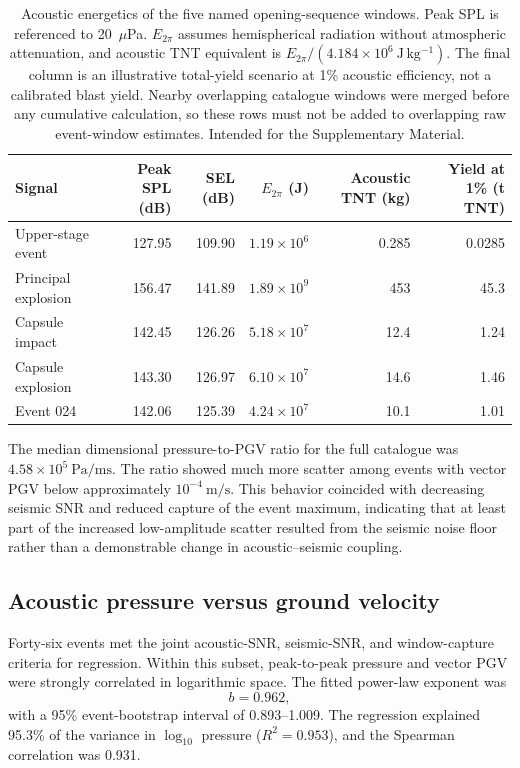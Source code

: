 \documentclass[]{seismica}
\begin{document}
\begin{table}[t]
\caption{Acoustic energetics of the five named opening-sequence windows.
Peak SPL is referenced to 20~$\mu$Pa. $E_{2\pi}$ assumes hemispherical
radiation without atmospheric attenuation, and acoustic TNT equivalent is
$E_{2\pi}/(4.184\times10^6~\mathrm{J\,kg^{-1}})$. The final column is an
illustrative total-yield scenario at 1\% acoustic efficiency, not a calibrated
blast yield. Nearby overlapping catalogue windows were merged before any
cumulative calculation, so these rows must not be added to overlapping raw
event-window estimates. Intended for the Supplementary Material.}
\label{tab:named_energetics}
\centering
\small
\begin{tabular}{lrrrrr}
\hline
Signal & Peak SPL (dB) & SEL (dB) & $E_{2\pi}$ (J) & Acoustic TNT (kg) & Yield at 1\% (t TNT) \\
\hline
Upper-stage event & 127.95 & 109.90 & $1.19\times10^6$ & 0.285 & 0.0285 \\
Principal explosion & 156.47 & 141.89 & $1.89\times10^9$ & 453 & 45.3 \\
Capsule impact & 142.45 & 126.26 & $5.18\times10^7$ & 12.4 & 1.24 \\
Capsule explosion & 143.30 & 126.97 & $6.10\times10^7$ & 14.6 & 1.46 \\
Event 024 & 142.06 & 125.39 & $4.24\times10^7$ & 10.1 & 1.01 \\
\hline
\end{tabular}
\end{table}

The median dimensional pressure-to-PGV ratio for the full catalogue was
$4.58\times10^{5}\ \si{\pascal\per\metre\second}$. The ratio showed much more
scatter among events with vector PGV below approximately
$10^{-4}\ \si{\metre\per\second}$. This behavior coincided with decreasing
seismic SNR and reduced capture of the event maximum, indicating that at least
part of the increased low-amplitude scatter resulted from the seismic noise
floor rather than a demonstrable change in acoustic--seismic coupling.


\subsection{Acoustic pressure versus ground velocity}
\label{sec:results_regression}

Forty-six events met the joint acoustic-SNR, seismic-SNR, and window-capture
criteria for regression. Within this subset, peak-to-peak pressure and
vector PGV were strongly correlated in logarithmic space. The fitted power-law
exponent was
\begin{equation}
  b = 0.962,
\end{equation}
with a 95\% event-bootstrap interval of 0.893--1.009. The regression explained
95.3\% of the variance in $\log_{10}$ pressure ($R^2=0.953$), and the
Spearman correlation was 0.931.
\end{document}

